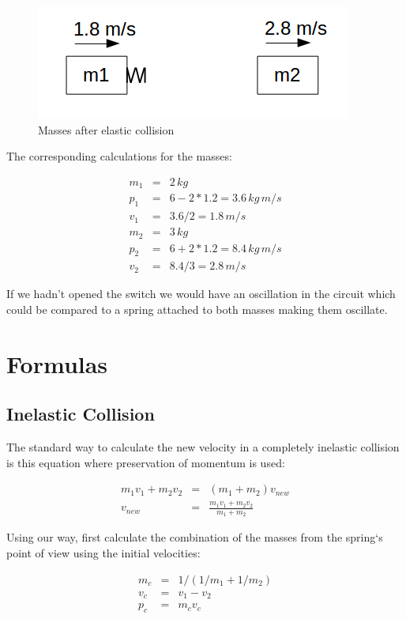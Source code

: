\begin{figure}[ht] \centering
	\includegraphics[scale=.5]{mms3} \caption{Masses after elastic collision}
\end{figure}

The corresponding calculations for the masses:

\begin{eqnarray}
m_1 &=& 2 \, kg \\
p_1 &=& 6 - 2*1.2 = 3.6 \, kg \, m/s \\
v_1 &=& 3.6 / 2 = 1.8 \, m/s \\
m_2 &=& 3 \, kg \\
p_2 &=& 6 + 2*1.2 = 8.4 \, kg \, m/s \\
v_2 &=& 8.4 / 3 = 2.8 \, m/s 
\end{eqnarray}

If we hadn't opened the switch we would have an oscillation in the circuit which could be compared to a spring attached to both masses making them oscillate.

\section{Formulas}

\subsection{Inelastic Collision}

The standard way to calculate the new velocity in a completely inelastic collision is this equation where preservation of momentum is used:

\begin{eqnarray}
m_1 v_1 + m_2 v_2 &=& (m_1 + m_2)v_{new} \\
v_{new} &=& \frac{m_1 v_1 + m_2 v_2}{m_1 + m_2}
\end{eqnarray}

Using our way, first calculate the combination of the masses from the spring`s point of view using the initial velocities:

\begin{eqnarray}
m_c &=& 1/(1/m_1 + 1/m_2) \\
v_c &=& v_1 - v_2 \\
p_c &=& m_c v_c
\end{eqnarray}

